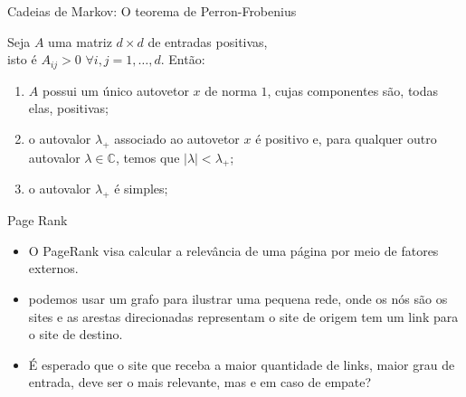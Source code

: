 \documentclass{beamer}
\begin{document}
\begin{frame}{Cadeias de Markov: O teorema de Perron-Frobenius}



    Seja $A$ uma matriz $d \times d$ de entradas positivas, \\ isto é $A_{ij}>0$ $\forall i, j = 1, \dots, d$. Então:
    
    \bigskip
    
    \begin{enumerate}
        \item $A$ possui um único autovetor $x$ de norma $1$, cujas componentes são, todas elas, positivas;
        \item o autovalor $\lambda_+$ associado ao autovetor $x$ é positivo e, para qualquer outro autovalor $\lambda \in \mathbb{C}$, temos que $|\lambda| < \lambda_+$;
        \item o autovalor $\lambda_+$ é simples;
    \end{enumerate}
    

\end{frame}
\begin{frame}{Page Rank}
\begin{itemize}


\item O PageRank visa calcular a relevância de uma página por meio de fatores externos.

\item podemos usar um grafo para ilustrar uma pequena rede, onde os nós são os sites e as arestas direcionadas representam o site de origem tem um link para o site de destino.

\item É esperado que o site que receba a maior quantidade de links, maior grau de entrada, deve ser o mais relevante, mas e em caso de empate?

\end{itemize}
\end{frame}
\end{document}
